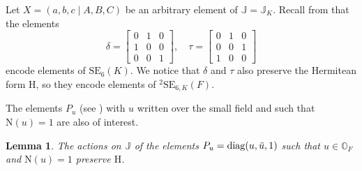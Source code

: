 \documentclass{amsart}
\def\ovu{\mathord{\mbox{\hspace*{0pt}}\,\overline{\!u\!\!\;}\!\:}\mbox{\hspace*{0pt}}}
\def\NN{\mathord{\mathrm{N}}}
\def\OO{\mathord{\mathbb{O}}}
\newcommand{\diag}{\mathrm{diag}}
\newcommand{\SE}{\mathrm{SE}}
\newcommand{\J}{\mathbb{J}}
\renewcommand{\H}{\mathrm{H}}
\theoremstyle{plain}
\numberwithin{theorem}{section}
\newtheorem{lemma}[theorem]{Lemma}
\theoremstyle{definition}
\begin{document}
Let $X = (a,b,c\mid A,B,C)$ be an arbitrary element of $\J = \J_K$. Recall from \cite{BSW1} that the elements
\begin{equation}
	\delta = \begin{bmatrix}
		0 & 1 & 0 \\
		1 & 0 & 0 \\
		0 & 0 & 1
	\end{bmatrix},\quad
	\tau = \begin{bmatrix}
		0 & 1 & 0 \\
		0 & 0 & 1 \\
		1 & 0 & 0
	\end{bmatrix}
\end{equation}
encode elements of $\SE_6(K)$. We notice that $\delta$ and 
$\tau$ also preserve the Hermitean form $\H$, so they encode elements of ${}^2\SE_{6,K}(F)$.

The elements $P_u$ (see \cite[Section 6]{BSW1}) with $u$ written over the small field and such that $\NN(u) = 1$ are also of interest. 

\begin{lemma}
	\label{lemma:5_pu_hermitean}
	The actions on $\J$ of the elements $P_u = \diag(u,\ovu,1)$ such that $u \in \OO_F$ and $\NN(u) = 1$
	preserve $\H$.
\end{lemma}
\end{document}
